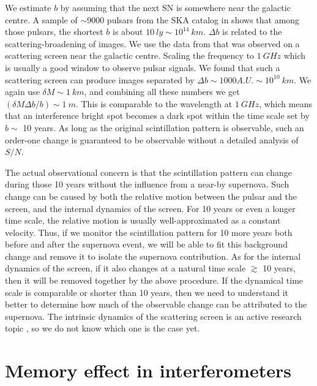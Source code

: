 \documentclass[aps,showpacs,onecolumn,floats,prd,superscriptaddress,nofootinbib]{revtex4-1}
\begin{document}
We estimate $b$ by assuming that the next SN is somewhere near the galactic centre. 
A sample of $\sim 9000$ pulsars from the SKA catalog in \cite{MSPpopulation} shows that among those pulsars, the shortest $b$ is about $10\ ly \sim 10^{14} \ km$. 
$\Delta b$ is related to the scattering-broadening of images. 
We use the data from \cite{BowBel13} that was observed on a scattering screen near the galactic centre. 
Scaling the frequency to $1\ GHz$ which is usually a good window to observe pulsar signals. 
We found that such a scattering screen can produce images separated by $\Delta b\sim 1000A.U. \sim 10^{10} \ km$. 
We again use $\delta M \sim 1 \ km$, and combining all these numbers we get $(\delta M \Delta b / b) \sim 1 \ m$. 
This is comparable to the wavelength at $1 \ GHz$, which means that an interference bright spot becomes a dark spot within the time scale set by $b\sim$ 10 years. 
As long as the original scintillation pattern is observable, such an order-one change is guaranteed to be observable without a detailed analysis of $S/N$.

The actual observational concern is that the scintillation pattern can change during those 10 years without the influence from a near-by supernova.
Such change can be caused by both the relative motion between the pulsar and the screen, and the internal dynamics of the screen.
For 10 years or even a longer time scale, the relative motion is usually well-approximated as a constant velocity.
Thus, if we monitor the scintillation pattern for 10 more years both before and after the supernova event, we will be able to fit this background change and remove it to isolate the supernova contribution.
As for the internal dynamics of the screen, if it also changes at a natural time scale $\gtrsim$ 10 years, then it will be removed together by the above procedure.
If the dynamical time scale is comparable or shorter than 10 years, then we need to understand it better to determine how much of the observable change can be attributed to the supernova.
The intrinsic dynamics of the scattering screen is an active research topic \cite{Liu:2015, Pen:2013}  , so we do not know which one is the case yet.


\section{Memory effect in interferometers}
\label{RelV}
\end{document}
